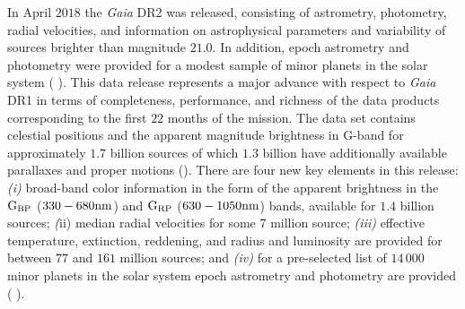 In April $2018$ the \textit{Gaia} DR2 was released, consisting of astrometry, photometry, radial velocities, and information on astrophysical parameters and variability of sources brighter than magnitude $21.0$. In addition, epoch astrometry and photometry were provided for a modest sample of minor planets in the solar system ( \citeyear{2018arXiv180409365G}). This data release represents a major advance with respect to \textit{Gaia} DR1 in terms of completeness, performance, and richness of the data products corresponding to the first $22$ months of the mission. The data set contains celestial positions and the apparent magnitude brightness in G-band for approximately $1.7$ billion sources of which $1.3$ billion have additionally available parallaxes and proper motions  (\citeyear{2018arXiv180409366L}). There are four new key elements in this release: \textit{(i)} broad-band color information in the form of the apparent brightness in the $\textnormal{G}_\textnormal{BP}$ ($330-680\textnormal{nm}$) and $\textnormal{G}_\textnormal{RP}$ ($630-1050\textnormal{nm}$) bands, available for $1.4$ billion sources; \textit(ii) median radial velocities for some $7$ million source; \textit{(iii)} effective temperature, extinction, reddening, and radius and luminosity are provided for between $77$ and $161$ million sources; and \textit{(iv)} for a pre-selected list of $14\,000$ minor planets in the solar system epoch astrometry and photometry are provided ( \citeyear{2018arXiv180409365G}).\\ %

